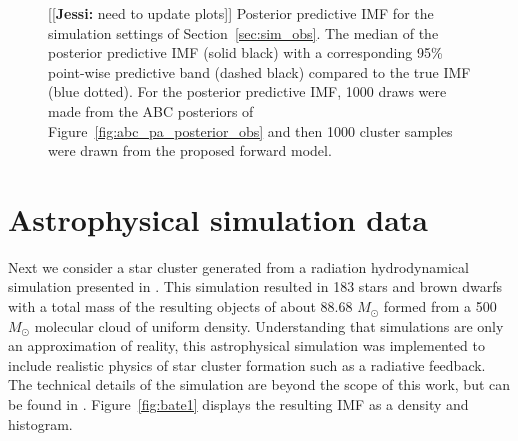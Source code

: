 \documentclass[12pt]{article}
\newcommand{\jessi}[1]{{\color{blue}[[\textbf{Jessi: }#1]]}}
\newcommand{\Msun}{M_{\odot}}
\begin{document}
\begin{figure}[htbp]
\centering
 \caption{\jessi{need to update plots} Posterior predictive IMF for the simulation settings of Section~\ref{sec:sim_obs}. 
The median of the posterior predictive IMF (solid black) with a corresponding 95\% point-wise predictive band (dashed black) compared to the true IMF (blue dotted).  For the posterior predictive IMF, 1000 draws were made from the ABC posteriors of Figure~\ref{fig:abc_pa_posterior_obs} and then 1000 cluster samples were drawn from the proposed forward model.  
} \label{fig:abc_pa_pred_obs}
\end{figure}


\section{Astrophysical simulation data} \label{sec:bate}

Next we consider a star cluster generated from a radiation hydrodynamical simulation presented in \cite{Bate2012}.  This simulation resulted in 183 stars and brown dwarfs with a total mass of the resulting objects of about 88.68 $\Msun$ formed from a 500 $\Msun$ molecular cloud of uniform density.  
Understanding that simulations are only an approximation of reality, this astrophysical simulation was implemented to include realistic physics of star cluster formation such as a radiative feedback. 
The technical details of the simulation are beyond the scope of this work, but can be found in \cite{Bate2012}.
Figure~\ref{fig:bate1} displays the resulting IMF as a density and histogram.
%
\end{document}
